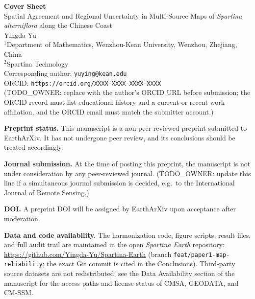 \documentclass[11pt]{article}
\begin{document}
\begin{center}
{\Large\bfseries Cover Sheet}\\[10pt]
{\Large Spatial Agreement and Regional Uncertainty in Multi-Source Maps of
\textit{Spartina alterniflora} along the Chinese Coast}\\[10pt]
{\large Yingda Yu}\\[4pt]
$^{1}$Department of Mathematics, Wenzhou-Kean University, Wenzhou, Zhejiang, China\\
$^{2}$Spartina Technology\\[4pt]
Corresponding author: \texttt{yuying@kean.edu}\\[6pt]
ORCID: \texttt{https://orcid.org/XXXX-XXXX-XXXX-XXXX}\\
{\small (TODO\_OWNER: replace with the author's ORCID URL before submission;
the ORCID record must list educational history and a current or recent work
affiliation, and the ORCID email must match the submitter account.)}
\end{center}

\vspace{8pt}

\noindent\textbf{Preprint status.} This manuscript is a non-peer reviewed
preprint submitted to EarthArXiv. It has not undergone peer review, and its
conclusions should be treated accordingly.

\vspace{4pt}

\noindent\textbf{Journal submission.} At the time of posting this preprint,
the manuscript is not under consideration by any peer-reviewed journal.
(TODO\_OWNER: update this line if a simultaneous journal submission is
decided, e.g.\ to the International Journal of Remote Sensing.)

\vspace{4pt}

\noindent\textbf{DOI.} A preprint DOI will be assigned by EarthArXiv upon
acceptance after moderation.

\vspace{4pt}

\noindent\textbf{Data and code availability.} The harmonization code, figure
scripts, result files, and full audit trail are maintained in the open
\textit{Spartina Earth} repository:
\url{https://github.com/Yingda-Yu/Spartina-Earth}
(branch \texttt{feat/paper1-map-reliability}; the exact Git commit is cited
in the Conclusions). Third-party source datasets are not redistributed; see
the Data Availability section of the manuscript for the access paths and
license status of CMSA, GEODATA, and CM-SSM.
\end{document}
